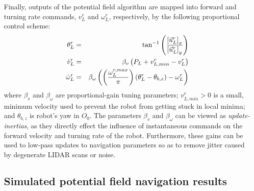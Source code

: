 			Finally, outputs of the potential field algorithm are mapped into forward and turning rate commands, ${v}_{L}^{r}$ and $\omega_{L}^{r}$, respectively, by the following proportional control scheme:
				\begin{eqnarray}
					\theta_{L}^{r} 			&=& \tan^{-1}\left( \frac{ \left[\vec{u}^{r}_{L}\right]_{x} }{ \left[\vec{u}^{r}_{L}\right]_{y} } \right) \nonumber\\
					\dot{v}_{L}^{r} 		&=& \beta_{v} \left( P_{L} + v_{L,min}^{r} - v_{L}^{r} \right) \nonumber \\
					\dot{\omega}_{L}^{r} 	&=& \beta_{\omega} \left( \left( \frac{ \omega_{L}^{r,max} }{\pi} \right) \left(  \theta_{L}^{r} - \theta_{b,z} \right) - \omega_{L}^{r} \right)
				\end{eqnarray}
			where $\beta_{v}$ and $\beta_{\omega}$ are proportional-gain tuning parameters; $v_{L,min}^{r}>0$ is a small, minimum velocity used to prevent the robot from getting stuck in local minima; and $\theta_{b,z}$ is robot's yaw in $O_{0}$. The parameters $\beta_{v}$ and $\beta_{\omega}$ can be viewed as \emph{update-inertias}, as they directly effect the influence of instantaneous commands on the forward velocity and turning rate of the robot. Furthermore, these gains can be used to low-pass updates to navigation parameters so as to remove jitter caused by degenerate LIDAR scans or noise.


		\subsection{Simulated potential field navigation results}

